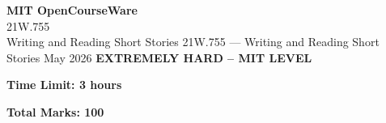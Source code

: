 \documentclass[12pt,a4paper]{exam}
\begin{document}
\begin{center}
{\LARGE \textbf{MIT OpenCourseWare}}\\21W.755\\Writing and Reading Short Stories
\vspace{0.5cm}
{21W.755} --- {Writing and Reading Short Stories}
\vspace{0.3cm}
May 2026
\vspace{0.3cm}
\textbf{EXTREMELY HARD -- MIT LEVEL}
\end{center}

\begin{center}
\textbf{Time Limit: 3 hours}
\end{center}

\begin{center}
\textbf{Total Marks: 100}
\end{center}

\vspace{0.5cm}
\end{document}
